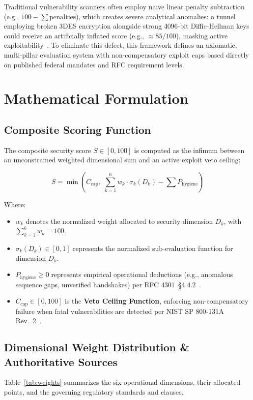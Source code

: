 \documentclass[11pt,a4paper]{article}
\begin{document}
Traditional vulnerability scanners often employ naive linear penalty subtraction (e.g., $100 - \sum \text{penalties}$), which creates severe analytical anomalies: a tunnel employing broken 3DES encryption alongside strong 4096-bit Diffie-Hellman keys could receive an artificially inflated score (e.g., $\approx 85/100$), masking active exploitability~\cite{sweet32}. To eliminate this defect, this framework defines an axiomatic, multi-pillar evaluation system with non-compensatory exploit caps based directly on published federal mandates and RFC requirement levels.

\section{Mathematical Formulation}

\subsection{Composite Scoring Function}
The composite security score $S \in [0, 100]$ is computed as the infimum between an unconstrained weighted dimensional sum and an active exploit veto ceiling:

\begin{equation}
S = \min\left( C_{\text{cap}}, \; \sum_{k=1}^{6} w_k \cdot \sigma_k(D_k) - \sum P_{\text{hygiene}} \right)
\end{equation}

Where:
\begin{itemize}[noitemsep]
    \item $w_k$ denotes the normalized weight allocated to security dimension $D_k$, with $\sum_{k=1}^{6} w_k = 100$.
    \item $\sigma_k(D_k) \in [0, 1]$ represents the normalized sub-evaluation function for dimension $D_k$.
    \item $P_{\text{hygiene}} \ge 0$ represents empirical operational deductions (e.g., anomalous sequence gaps, unverified handshakes) per RFC 4301~\S 4.4.2~\cite{rfc4301}.
    \item $C_{\text{cap}} \in [0, 100]$ is the \textbf{Veto Ceiling Function}, enforcing non-compensatory failure when fatal vulnerabilities are detected per NIST SP 800-131A Rev.~2~\cite{nist800-131ar2}.
\end{itemize}

\subsection{Dimensional Weight Distribution \& Authoritative Sources}
Table~\ref{tab:weights} summarizes the six operational dimensions, their allocated points, and the governing regulatory standards and clauses.
\end{document}
